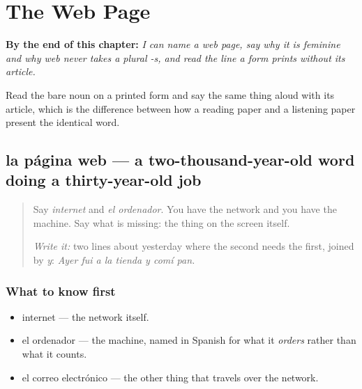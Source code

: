 
\chapter{The Web Page}
\label{ch:pagina-web}

\begin{chapteropening}
\textbf{By the end of this chapter:} \emph{I can name a web page, say why it is feminine and why web never takes a plural -s, and read the line a form prints without its article.}

Read the bare noun on a printed form and say the same thing aloud with its article, which is the difference between how a reading paper and a listening paper present the identical word.
\end{chapteropening}

\section[la página web]{la página web — a two-thousand-year-old word doing a thirty-year-old job}

\label{lesson:ES-C422-pagina-web}



\begin{quote}
Say \emph{internet} and \emph{el ordenador}. You have the network and you have the machine. Say what is missing: the thing on the screen itself.

\emph{Write it:} two lines about yesterday where the second needs the first, joined by \emph{y}: \emph{Ayer fui a la tienda y comí pan.}
\end{quote}

\subsection*{What to know first}
\begin{itemize}
\raggedright
  \item internet — the network itself.
  \item el ordenador — the machine, named in Spanish for what it \emph{orders} rather than what it counts.
  \item el correo electrónico — the other thing that travels over the network.
\end{itemize}

